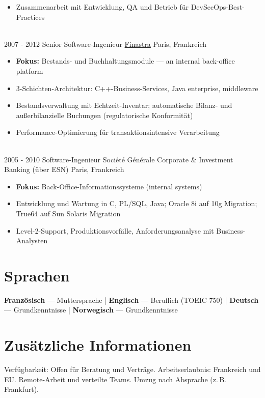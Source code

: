 \documentclass[letterpaper]{twentysecondcv} %
\begin{document}
\begin{twentytimeline}
{\begin{itemize}
		\item Zusammenarbeit mit Entwicklung, QA und Betrieb für DevSecOps-Best-Practices
		\end{itemize}}
	\\
	\twentyitemtimeline{\faCode}
		{2007 -}
		{2012}
		{Senior Software-Ingenieur}
		{\href{https://finastra.com}{Finastra}}
		{Paris, Frankreich}
		{\begin{itemize}
		\item \textbf{Fokus:} Bestands- und Buchhaltungsmodule — an internal back-office platform
		\item 3-Schichten-Architektur: C++-Business-Services, Java enterprise, middleware
		\item Bestandsverwaltung mit Echtzeit-Inventar; automatische Bilanz- und außerbilanzielle Buchungen (regulatorische Konformität)
		\item Performance-Optimierung für transaktionsintensive Verarbeitung
		\end{itemize}}
	\\
	\twentyitemtimeline{\faBriefcase}
		{2005 -}
		{2010}
		{Software-Ingenieur}
		{Société Générale Corporate \& Investment Banking (über ESN)}
		{Paris, Frankreich}
		{\begin{itemize}
		\item \textbf{Fokus:} Back-Office-Informationssysteme (internal systems)
		\item Entwicklung und Wartung in C, PL/SQL, Java; Oracle 8i auf 10g Migration; True64 auf Sun Solaris Migration
		\item Level-2-Support, Produktionsvorfälle, Anforderungsanalyse mit Business-Analysten
		\end{itemize}}
\end{twentytimeline}


\section{Sprachen}

\textbf{Französisch} — Muttersprache | \textbf{Englisch} — Beruflich (TOEIC 750) | \textbf{Deutsch} — Grundkenntnisse | \textbf{Norwegisch} — Grundkenntnisse

\section{Zusätzliche Informationen}

Verfügbarkeit: Offen für Beratung und Verträge. Arbeitserlaubnis: Frankreich und EU. Remote-Arbeit und verteilte Teams. Umzug nach Absprache (z.\,B. Frankfurt).

\end{document}
